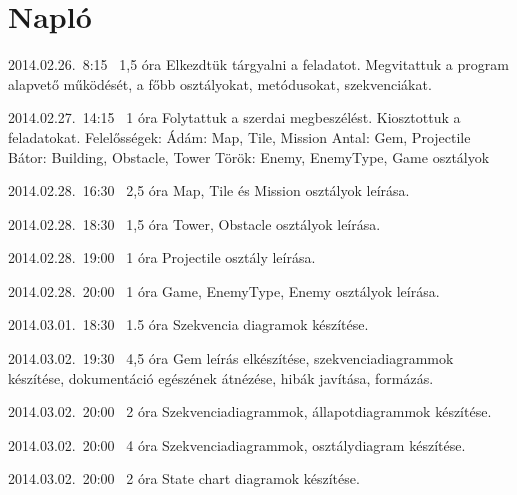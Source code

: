 %
\section{Napló}

\begin{naplo}

\bejegyzes
{2014.02.26.~8:15~} %
{1,5 óra} %
{\vadam\newline
\vantal\newline
\vbator\newline
\vtorok}
{Elkezdtük tárgyalni a feladatot. Megvitattuk a program alapvető működését, a főbb osztályokat, metódusokat, szekvenciákat.}

\bejegyzes
{2014.02.27.~14:15~}
{1 óra}
{\vadam\newline
\vantal\newline
\vbator\newline
\vtorok}
{Folytattuk a szerdai megbeszélést. Kiosztottuk a feladatokat. \newline Felelősségek: \newline
Ádám: Map, Tile, Mission \newline
Antal: Gem, Projectile \newline
Bátor: Building, Obstacle, Tower \newline
Török: Enemy, EnemyType, Game \newline osztályok}

\bejegyzes
{2014.02.28.~16:30~}
{2,5 óra}
{\vadam}
{Map, Tile és Mission osztályok leírása.}

\bejegyzes
{2014.02.28.~18:30~}
{1,5 óra}
{\vbator}
{Tower, Obstacle osztályok leírása.}

\bejegyzes
{2014.02.28.~19:00~}
{1 óra}
{\vantal}
{Projectile osztály leírása.}

\bejegyzes
{2014.02.28.~20:00~}
{1 óra}
{\vtorok}
{Game, EnemyType, Enemy osztályok leírása.}

\bejegyzes
{2014.03.01.~18:30~}
{1.5 óra}
{\vadam}
{Szekvencia diagramok készítése.}

\bejegyzes
{2014.03.02.~19:30~}
{4,5 óra}
{\vantal}
{Gem leírás elkészítése, szekvenciadiagrammok készítése, dokumentáció egészének átnézése, hibák javítása, formázás.}

\bejegyzes
{2014.03.02.~20:00~}
{2 óra}
{\vadam}
{Szekvenciadiagrammok, állapotdiagrammok készítése.}

\bejegyzes
{2014.03.02.~20:00~}
{4 óra}
{\vbator}
{Szekvenciadiagrammok, osztálydiagram készítése.}

\bejegyzes
{2014.03.02.~20:00~}
{2 óra}
{\vadam}
{State chart diagramok készítése.}

\end{naplo}

